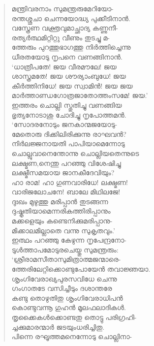 \begin{verse}
മന്ത്രിവരനാം സുമന്ത്രരുമേറിയോ-\\
രന്തശ്ശുചാ ചെന്നയോദ്ധ്യ പുക്കീടിനാന്‍.\\
വസ്ത്രേണ വക്ത്രവുമാച്ഛാദ്യ കണ്ണുനീ-\\
രത്യര്‍ത്ഥമിറ്റിറ്റു വീണും തുടച്ചു മ-\\
ത്തേരും പുറത്തുഭാഗത്തു നിര്‍ത്തിച്ചെന്നു\\
ധീരതയോടു നൃപനെ വണങ്ങിനാന്‍.\\
‘ധാത്രീപതേ! ജയ വീരമൗലേ! ജയ\\
ശാസ്ത്രമതേ! ജയ ശൗര്യാംബുധേ! ജയ\\
കീര്‍ത്തിനിധേ! ജയ സ്വാമിന്‍! ജയ ജയ\\
മാര്‍ത്താണ്ഡഗോത്രജാതോത്തംസമേ! ജയ.’\\
ഇത്തരം ചൊല്ലി സ്തുതിച്ചു വണങ്ങിയ\\
ഭൃത്യനോടാശു ചോദിച്ചു നൃപോത്തമന്‍.\\
‘സോദരനോടും ജനകാന്മജയോടു-\\
മേതൊരു ദിക്കിലിരിക്കുന്നു രാഘവന്‍?\\
നിര്‍ലജ്ജനായതി പാപിയാമെന്നോടു\\
ചൊല്ലുവാനെന്തോന്നു ചൊല്ലിയതെന്നുടെ\\
ലക്ഷ്മണ,നെന്തു പറഞ്ഞു വിശേഷിച്ചു\\
ലക്ഷ്മീസമയായ ജാനകീദേവിയും?\\
ഹാ രാമ! ഹാ ഗുണവാരിധേ! ലക്ഷ്മണ!\\
വാരിജലോചനേ! ബാലേ മിഥിലജേ!\\
ദുഃഖം മുഴുത്തു മരിപ്പാന്‍ തുടങ്ങന്ന\\
ദുഷ്കൃതിയാമെന്നരികത്തിരിപ്പാനും\\
മക്കളെയും കണ്ടെനിക്കുമരിപ്പാനു-\\
മിക്കാലമില്ലാതെ വന്നു സുകൃതവും.’\\
ഇത്ഥം പറഞ്ഞു കേഴുന്ന നൃപേന്ദ്രനോ-\\
ടുള്‍ത്താപമോടുരചെയ്തു സുമന്ത്രരും:\\
‘ശ്രീരാമസീതാസുമിത്രാത്മജന്മാരെ-\\
ത്തേരിലേറ്റിക്കൊണ്ടുപോയേന്‍ തവാജ്ഞയാ.\\
ശൃംഗിവേരാഖ്യപുരസവിധേ ചെന്നു\\
ഗംഗാതടേ വസിച്ചീടും ദശാന്തരേ\\
കണ്ടു തൊഴുതിതു ശൃംഗിവേരാധിപന്‍\\
കൊണ്ടുവന്നൂ ഗുഹന്‍ മൂലഫലാദികള്‍.\\
തൃക്കൈകള്‍ക്കൊണ്ടതു തൊട്ടു പരിഗ്രഹി-\\
ച്ചക്കുമാരന്മാര്‍ ജടയുംധരിച്ചിതു.\\
പിന്നെ രഘൂത്തമനെന്നോടു ചൊല്ലിനാ-\\

\end{verse}
